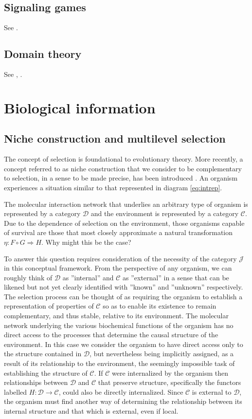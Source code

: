 \documentclass[aps,twocolumn]{revtex4}
\begin{document}
\subsection{Signaling games}
See \cite{Huttegger2007}.

\subsection{Domain theory}
See \cite{Abramsky}, \cite{Abramsky1995}.

\section{Biological information}
\subsection{Niche construction and multilevel selection}
The concept of selection is foundational to evolutionary theory. More recently, a concept referred to as niche construction that we consider to be complementary to selection, in a sense to be made precise, has been introduced \cite{Odling-Smee2003,Krakauer2009}. An organism experiences a situation similar to that represented in diagram \ref{eq:intrep}. 

 

The molecular interaction network that underlies an arbitrary type of organism is represented by a category $\mathcal{D}$ and the environment is represented by a category $\mathcal{C}$. Due to the dependence of selection on the environment, those organisms capable of survival are those that most closely approximate a natural transformation $\eta:F \circ G \Rightarrow H$. Why might this be the case?

To answer this question requires consideration of the necessity of the category $\mathcal{J}$ in this conceptual framework. From the perspective of any organism, we can roughly think of $\mathcal{D}$ as ''internal'' and $\mathcal{C}$ as ''external'' in a sense that can be likened but not yet clearly identified with ''known'' and ''unknown'' respectively. The selection process can be thought of as requiring the organism to establish a representation of properties of $\mathcal{C}$ so as to enable its existence to remain complementary, and thus stable, relative to its environment. The molecular network underlying the various biochemical functions of the organism has no direct access to the processes that determine the causal structure of the environment. In this case we consider the organism to have direct access only to the structure contained in $\mathcal{D}$, but nevertheless being implicitly assigned, as a result of its relationship to the environment, the seemingly impossible task of establishing the structure of $\mathcal{C}$. If $\mathcal{C}$ were internalized by the organism then relationships between $\mathcal{D}$ and $\mathcal{C}$ that preserve structure, specifically the functors labelled $H:\mathcal{D} \rightarrow \mathcal{C}$, could also be directly internalized. Since $\mathcal{C}$ is external to $\mathcal{D}$, the organism must find another way of determining the relationship between its internal structure and that which is external, even if local.
\end{document}
